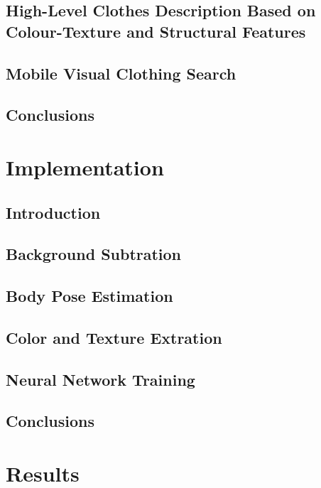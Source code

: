 \documentclass[titlepage,12pt,a4paper,times]{book}
\begin{document}
\section{High-Level Clothes Description Based on Colour-Texture and Structural
Features}
\label{chap2:sec:art4}

\section{Mobile Visual Clothing Search}
\label{chap2:sec:art5}

\section{Conclusions}
\label{chap2:sec:concs}

\chapter{Implementation}
\label{chap:imp}

\section{Introduction}
\label{chap3:sec:intro}

\section{Background Subtration}
\label{chap3:sec:bs}

\section{Body Pose Estimation}
\label{chap3:sec:bps}

\section{Color and Texture Extration}
\label{chap3:sec:cte}

\section{Neural Network Training}
\label{chap3:sec:nnt}

\section{Conclusions}
\label{chap3:sec:concs}

\chapter{Results}
\label{chap:res}
\end{document}
